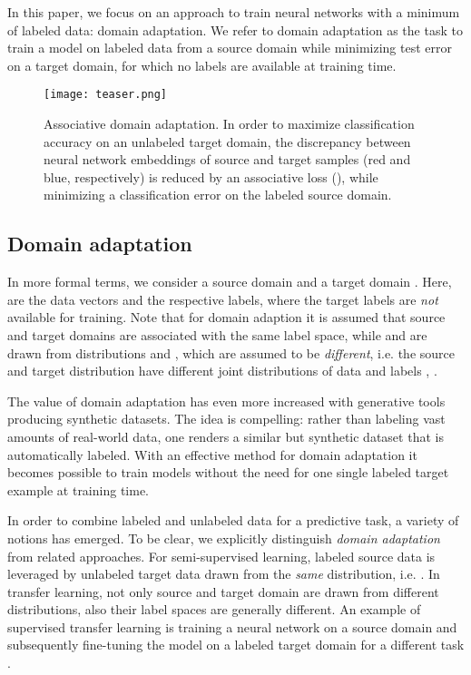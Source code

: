 \documentclass[10pt,twocolumn,letterpaper]{article}
\begin{document}
In this paper, we focus on an approach to train neural networks with a minimum of labeled data: domain adaptation.
We refer to domain adaptation as the task to train a model on labeled data from a source domain while minimizing test error on a target domain, for which no labels are available at training time.

\begin{figure}[t!]
	\centering
    \texttt{[image: teaser.png]}
    \caption{Associative domain adaptation. In order to maximize classification accuracy on an unlabeled target domain, the discrepancy between neural network embeddings of source and target samples (red and blue, respectively) is reduced by an associative loss (), while minimizing a classification error on the labeled source domain.}
	\label{fig:teaser}
\end{figure}

\subsection{Domain adaptation}
\label{sec:domain_adaptation}
In more formal terms, we consider a source domain  and a target domain .
Here,  are the data vectors and  the respective labels, where the target labels  are \textit{not} available for training.
Note that for domain adaption it is assumed that source and target domains are associated with the same label space, while  and  are drawn from distributions  and , which are assumed to be \textit{different}, i.e. the source and target distribution have different joint distributions of data  and labels , .


The value of domain adaptation has even more increased with generative tools producing synthetic datasets.
The idea is compelling: rather than labeling vast amounts of real-world data, one renders a similar but synthetic dataset that is automatically labeled. With an effective method for domain adaptation it becomes possible to train models without the need for one single labeled target  example at training time. 

In order to combine labeled and unlabeled data for a predictive task, a variety of notions has emerged.  To be clear, we explicitly distinguish \emph{domain adaptation} from related approaches.
For semi-supervised learning, labeled source data is leveraged by unlabeled target data drawn from the \textit{same} distribution, i.e. .
In transfer learning, not only source and target domain are drawn from different distributions, also their label spaces are generally different.
An example of supervised transfer learning is training a neural network on a source domain and subsequently fine-tuning the model on a labeled target domain for a different task \cite{Yosinski2014, Donahue2014}.
\end{document}

